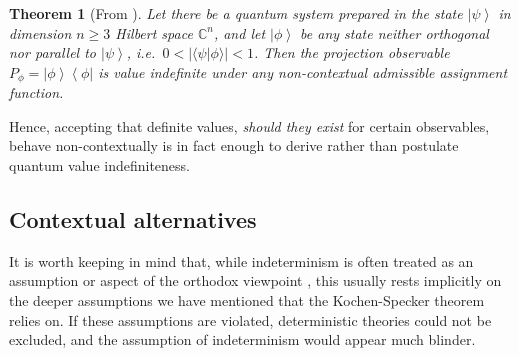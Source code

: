 \documentclass[%
 superscriptaddress,
 preprint,
 showpacs,
 showkeys,
 preprintnumbers,
  amsmath,amssymb,
  aps,
 pra,
  longbibliography,
  floatfix,
 ]{revtex4-1}
\newtheorem{theorem}{Theorem}
\theoremstyle{definition}
\newcommand{\C}{\mathbb{C}}%
\newcommand{\bra}[1]{\left< #1 \right|}
\newcommand{\ket}[1]{\left| #1 \right>}
\newcommand{\iprod}[2]{\langle #1 | #2 \rangle}
\begin{document}
\begin{theorem}[From \cite{2012-incomput-proofsCJ,PhysRevA.89.032109}]
	\label{thm:vi-everywhere}
		Let there be a quantum system prepared in the state
	$\ket{\psi}$ in dimension $n\ge 3$ Hilbert space $\C^n$, and let $\ket{\phi}$ be any state neither orthogonal nor parallel to $\ket{\psi}$, i.e.\ $0<|\iprod{\psi}{\phi}|<1$.
	Then the projection observable $P_\phi=\ket{\phi}\bra{\phi}$ is value indefinite under any non-contextual admissible assignment function.
\end{theorem}

Hence,  accepting that definite values, \emph{should they exist} for certain observables, behave non-contextually is in fact enough to derive rather than postulate quantum value indefiniteness.

\subsection{Contextual alternatives}

It is worth keeping in mind that, while indeterminism is often treated as an assumption or aspect of the orthodox viewpoint \cite{born-26-1,zeil-05_nature_ofQuantum}, this usually rests implicitly on the deeper assumptions we have mentioned that the Kochen-Specker theorem relies on.
If these assumptions are violated, deterministic theories could not be excluded, and the assumption of indeterminism would appear much blinder.

\end{document}
